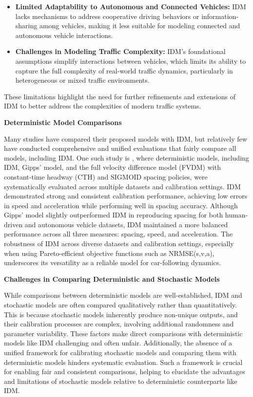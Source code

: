 \documentclass[a4paper,fleqn,11pt]{reviewresponse}
\renewenvironment{quotation}
  {\begingroup\color{customblue}%
   \captionsetup{labelfont={bf},textfont={color=customblue},font={color=customblue}}%
   \list{}{\leftmargin=0em \rightmargin=0em} %
   \item\relax\small}
  {\endlist\endgroup}
\begin{document}
\begin{quotation}
\begin{itemize}
    \item \textbf{Limited Adaptability to Autonomous and Connected Vehicles:} IDM lacks mechanisms to address cooperative driving behaviors or information-sharing among vehicles, making it less suitable for modeling connected and autonomous vehicle interactions.
    
    \item \textbf{Challenges in Modeling Traffic Complexity:} IDM's foundational assumptions simplify interactions between vehicles, which limits its ability to capture the full complexity of real-world traffic dynamics, particularly in heterogeneous or mixed traffic environments.
\end{itemize}

These limitations highlight the need for further refinements and extensions of IDM to better address the complexities of modern traffic systems.

\textbf{Deterministic Model Comparisons}

Many studies have compared their proposed models with IDM, but relatively few have conducted comprehensive and unified evaluations that fairly compare all models, including IDM. One such study is \cite{punzoCalibrationCarFollowingDynamicsAutomated2021}, where deterministic models, including IDM, Gipps' model, and the full velocity difference model (FVDM) with constant-time headway (CTH) and SIGMOID spacing policies, were systematically evaluated across multiple datasets and calibration settings. IDM demonstrated strong and consistent calibration performance, achieving low errors in speed and acceleration while performing well in spacing accuracy. Although Gipps' model slightly outperformed IDM in reproducing spacing for both human-driven and autonomous vehicle datasets, IDM maintained a more balanced performance across all three measures: spacing, speed, and acceleration. The robustness of IDM across diverse datasets and calibration settings, especially when using Pareto-efficient objective functions such as NRMSE(s,v,a), underscores its versatility as a reliable model for car-following dynamics.

\textbf{Challenges in Comparing Deterministic and Stochastic Models}

While comparisons between deterministic models are well-established, IDM and stochastic models are often compared qualitatively rather than quantitatively. This is because stochastic models inherently produce non-unique outputs, and their calibration processes are complex, involving additional randomness and parameter variability. These factors make direct comparisons with deterministic models like IDM challenging and often unfair. Additionally, the absence of a unified framework for calibrating stochastic models and comparing them with deterministic models hinders systematic evaluation. Such a framework is crucial for enabling fair and consistent comparisons, helping to elucidate the advantages and limitations of stochastic models relative to deterministic counterparts like IDM.


\end{quotation}
\end{document}
